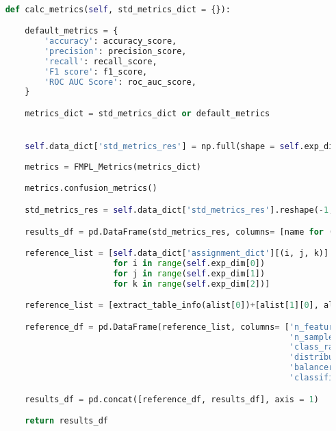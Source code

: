 \begin{lstlisting}[language=Python, numbers=none]

    def calc_metrics(self, std_metrics_dict = {}):

        default_metrics = {
            'accuracy': accuracy_score,
            'precision': precision_score,
            'recall': recall_score,
            'F1 score': f1_score,
            'ROC AUC Score': roc_auc_score,
        }

        metrics_dict = std_metrics_dict or default_metrics


        self.data_dict['std_metrics_res'] = np.full(shape = self.exp_dim + (len(metrics_dict),), fill_value = np.nan)
        
        metrics = FMPL_Metrics(metrics_dict)

        metrics.confusion_metrics()

        std_metrics_res = self.data_dict['std_metrics_res'].reshape(-1, len(metrics_dict))

        results_df = pd.DataFrame(std_metrics_res, columns= [name for (name, metr_func) in metrics.std_metric_list])

        reference_list = [self.data_dict['assignment_dict'][(i, j, k)] 
                          for i in range(self.exp_dim[0]) 
                          for j in range(self.exp_dim[1]) 
                          for k in range(self.exp_dim[2])]

        reference_list = [extract_table_info(alist[0])+[alist[1][0], alist[2][0]] for alist in reference_list]

        reference_df = pd.DataFrame(reference_list, columns= ['n_features', 
                                                              'n_samples', 
                                                              'class_ratio', 
                                                              'distributions', 
                                                              'balancer', 
                                                              'classifier'])

        results_df = pd.concat([reference_df, results_df], axis = 1)

        return results_df
\end{lstlisting}




